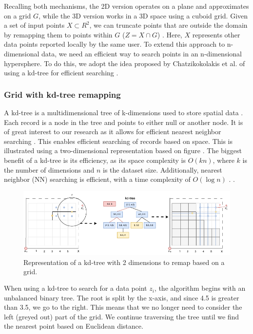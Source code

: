 Recalling both mechanisms, the 2D version operates on a plane and approximates on a grid $G$, while the 3D version works in a 3D space using a cuboid grid.
Given a set of input points $X \subset R^2$, we can truncate points that are outside the domain by remapping them to points within $G$ ($Z = X \cap G$) \citep{DBLP:journals/corr/abs-1212-1984}.
Here, $X$ represents other data points reported locally by the same user.
To extend this approach to n-dimensional data, we need an efficient way to search points in an n-dimensional hypersphere.
To do this, we adopt the idea proposed by Chatzikokolakis et al. of using a kd-tree for efficient searching \citep{chatzikokolakis_efficient_2017}.
\subsubsection{Grid with kd-tree remapping}
A kd-tree is a multidimensional tree of k-dimensions used to store spatial data \citep{bentley_multidimensional_1975}.
Each record is a node in the tree and points to either null or another node.
It is of great interest to our research as it allows for efficient nearest neighbor searching \citep{washington_k-d_2002}.
This enables efficient searching of records based on space. This is illustrated using a two-dimensional representation based on figure .
The biggest benefit of a kd-tree is its efficiency, as its space complexity is $O(kn)$, where $k$ is the number of dimensions and $n$ is the dataset size.
Additionally, nearest neighbor (NN) searching is efficient, with a time complexity of $O(\log n)$ \citep{washington_k-d_2002}. .
\begin{figure}[H]
  \includegraphics[width=1\textwidth]{TheorethicalFramework/ND-Laplace/Images/KD-tree.png}
  \caption{Representation of a kd-tree with 2 dimensions to remap based on a grid.}
  \label{fig:kd-tree}
\end{figure}
When using a kd-tree to search for a data point $z_i$, the algorithm begins with an unbalanced binary tree.
The root is split by the x-axis, and since 4.5 is greater than 3.5, we go to the right.
This means that we no longer need to consider the left (greyed out) part of the grid.
We continue traversing the tree until we find the nearest point based on Euclidean distance.

